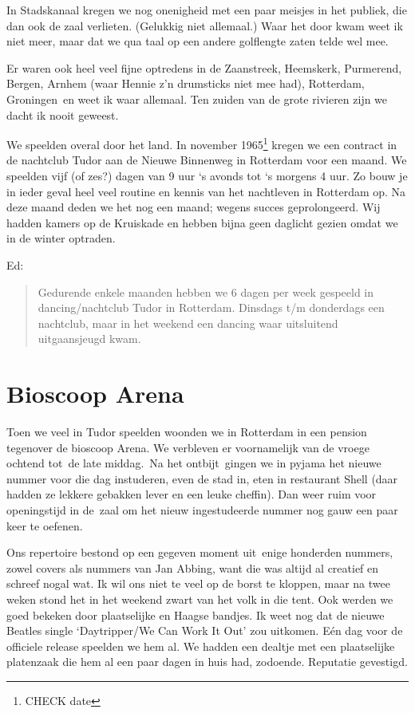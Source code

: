 \documentclass[12pt,twoside, openright]{memoir}
\begin{document}
In Stadskanaal kregen we nog onenigheid met een paar meisjes in het publiek, die dan ook de zaal verlieten. (Gelukkig niet allemaal.) Waar het door kwam weet ik niet meer, maar dat we qua taal op een andere golflengte zaten telde wel mee. 

Er waren ook heel veel fijne optredens in de Zaanstreek, Heemskerk, Purmerend, Bergen, Arnhem (waar Hennie z'n drumsticks niet mee had), Rotterdam, Groningen en weet ik waar allemaal. Ten zuiden van de grote rivieren zijn we dacht ik nooit geweest. 

We speelden overal door het land. In november 1965\footnote{CHECK date} kregen we een contract in de nachtclub Tudor aan de Nieuwe Binnenweg in Rotterdam voor een maand. We speelden vijf (of zes?) dagen van 9 uur `s avonds tot `s morgens 4 uur. Zo bouw je in ieder geval heel veel routine en kennis van het nachtleven in Rotterdam op. Na deze maand deden we het nog een maand; wegens succes geprolongeerd. Wij hadden kamers op de Kruiskade en hebben bijna geen daglicht gezien omdat we in de winter optraden. 


Ed: 

\begin{quote}
Gedurende enkele maanden hebben we 6 dagen per week gespeeld in dancing/nachtclub Tudor in Rotterdam. Dinsdags t/m donderdags een nachtclub, maar in het weekend een dancing waar uitsluitend uitgaansjeugd kwam.
\end{quote} 


\chapter{Bioscoop Arena} %
\label{cha:arena}

Toen we veel in Tudor speelden woonden we in Rotterdam in een pension tegenover de bioscoop Arena. We verbleven er voornamelijk van de vroege ochtend tot de late middag. Na het ontbijt gingen we in pyjama het nieuwe nummer voor die dag instuderen, even de stad in, eten in restaurant Shell (daar hadden ze lekkere gebakken lever en een leuke cheffin). Dan weer ruim voor openingstijd in de zaal om het nieuw ingestudeerde nummer nog gauw een paar keer te oefenen. 

Ons repertoire bestond op een gegeven moment uit enige honderden nummers, zowel covers als nummers van Jan Abbing, want die was altijd al creatief en schreef nogal wat. Ik wil ons niet te veel op de borst te kloppen, maar na twee weken stond het in het weekend zwart van het volk in die tent. Ook werden we goed bekeken door plaatselijke en Haagse bandjes. Ik weet nog dat de nieuwe Beatles single `Daytripper/We Can Work It Out' zou uitkomen. Eén dag voor de officiele release speelden we hem al. We hadden een dealtje met een plaatselijke platenzaak die hem al een paar dagen in huis had, zodoende. Reputatie gevestigd. 
\end{document}
